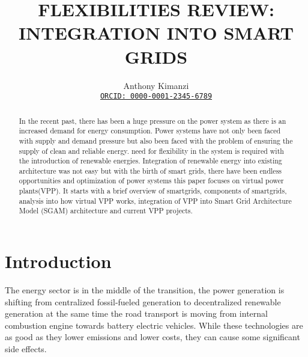 \documentclass[nonacm,sigconf,12pt]{acmart}
\newcommand{\myorcid}[1]{\href{https://orcid.org/#1}{\texttt{ORCID: #1}}}
\begin{document}
\title{FLEXIBILITIES REVIEW: INTEGRATION INTO SMART GRIDS }


\author{Anthony Kimanzi\\\myorcid{0000-0001-2345-6789}}







\begin{abstract}
    In the recent past, there has been a huge pressure on the power system as there is an increased demand for energy consumption. Power systems have not only been faced with supply and demand pressure but also been faced with the problem of ensuring the supply of clean and reliable energy. need for flexibility in the system is required with the introduction of renewable energies. Integration of renewable energy into existing architecture was not easy but with the birth of smart grids, there have been endless opportunities and optimization of power systems this paper focuses on virtual power plants(VPP). It starts with a brief overview of smartgrids, components of smartgrids, analysis into how virtual VPP works, integration of VPP into Smart Grid Architecture Model (SGAM) architecture and current VPP projects.
\end{abstract}
\maketitle

\section*{Introduction}
The energy sector is in the middle of the transition, the power generation is shifting from centralized fossil-fueled generation to decentralized renewable generation at the same time the road transport is moving from internal combustion engine towards battery electric vehicles. While these technologies are as good as they lower emissions and lower costs, they can cause some significant side effects. 
\end{document}
